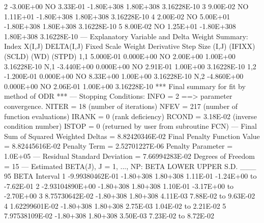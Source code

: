 {{           2 -3.00E+00       NO  3.33E-01 -1.80E+308  1.80E+308   3.16228E-10
           3  9.00E-02       NO  1.11E+01 -1.80E+308  1.80E+308   3.16228E-10
           4  2.00E-02       NO  5.00E+01 -1.80E+308  1.80E+308   3.16228E-10
           5  8.00E-02       NO  1.25E+01 -1.80E+308  1.80E+308   3.16228E-10
\phantom{blank line}
 --- Explanatory Variable and Delta Weight Summary:
\phantom{blank line}
       Index      X(I,J)  DELTA(I,J)    Fixed     Scale    Weight    Derivative
                                                                      Step Size
       (I,J)                          (IFIXX)    (SCLD)      (WD)        (STPD)
\phantom{blank line}
         1,1   5.000E-01   0.000E+00       NO  2.00E+00  1.00E+00   3.16228E-10
         N,1  -3.440E+00   0.000E+00       NO  2.91E-01  1.00E+00   3.16228E-10
\phantom{blank line}
         1,2  -1.200E-01   0.000E+00       NO  8.33E+00  1.00E+00   3.16228E-10
         N,2  -4.860E+00   0.000E+00       NO  2.06E-01  1.00E+00   3.16228E-10
\phantom{blank line}
 *** Final summary for fit by method of ODR ***
\phantom{blank line}
 --- Stopping Conditions:
         INFO =     2 ==> parameter convergence.
        NITER =    18          (number of iterations)
         NFEV =   217          (number of function evaluations)
        IRANK =     0          (rank deficiency)
        RCOND =     3.18E-02   (inverse condition number)
        ISTOP =     0          (returned by user from subroutine FCN)
\phantom{blank line}
 --- Final Sum of Squared Weighted Deltas =                     8.82420346E-02
         Final Penalty Function Value     =    8.82445616E-02
               Penalty Term               =    2.52701227E-06
               Penalty Parameter          =    1.0E+05
\phantom{blank line}
 --- Residual Standard Deviation          =                     7.66994283E-02
         Degrees of Freedom               =   15
\phantom{blank line}
 --- Estimated BETA(J), J = 1, ..., NP:
\phantom{blank line}
                     BETA      LOWER     UPPER      S.D.  ___ 95%
                                                    BETA         Interval
\phantom{blank line}
       1  -9.99380462E-01  -1.80+308  1.80+308  1.11E-01  -1.24E+00 to -7.62E-01
       2  -2.93104890E+00  -1.80+308  1.80+308  1.10E-01  -3.17E+00 to -2.70E+00
       3   8.75730642E-02  -1.80+308  1.80+308  4.11E-03   7.88E-02 to  9.63E-02
       4   1.62299601E-02  -1.80+308  1.80+308  2.75E-03   1.04E-02 to  2.21E-02
       5   7.97538109E-02  -1.80+308  1.80+308  3.50E-03   7.23E-02 to  8.72E-02
}}
\vfil\eject

